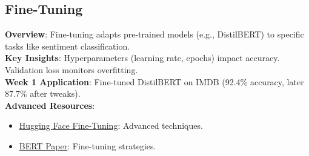 \documentclass[a4paper,12pt]{article}
\begin{document}
\subsection*{Fine-Tuning}
\textbf{Overview}: Fine-tuning adapts pre-trained models (e.g., DistilBERT) to specific tasks like sentiment classification. \\
\textbf{Key Insights}: Hyperparameters (learning rate, epochs) impact accuracy. Validation loss monitors overfitting. \\
\textbf{Week 1 Application}: Fine-tuned DistilBERT on IMDB (92.4\% accuracy, later 87.7\% after tweaks). \\
\textbf{Advanced Resources}:
\begin{itemize}
    \item \href{https://huggingface.co/docs/transformers/training}{Hugging Face Fine-Tuning}: Advanced techniques.
    \item \href{https://arxiv.org/abs/1810.04805}{BERT Paper}: Fine-tuning strategies.
\end{itemize}

\end{document}
